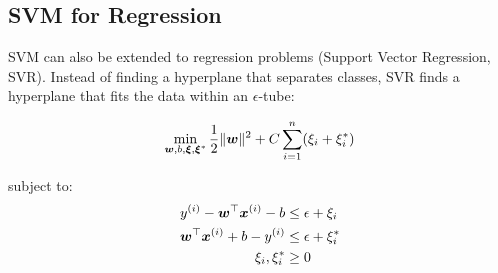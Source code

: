 \subsection{SVM for Regression}

SVM can also be extended to regression problems (Support Vector Regression, SVR). Instead of finding a hyperplane that separates classes, SVR finds a hyperplane that fits the data within an $\epsilon$-tube:

\begin{equation}
\min_{\boldsymbol{w}, b, \boldsymbol{\xi}, \boldsymbol{\xi}^*} \frac{1}{2}\|\boldsymbol{w}\|^2 + C \sum_{i=1}^{n} (\xi_i + \xi_i^*)
\end{equation}

subject to:
\begin{align}
y^{(i)} - \boldsymbol{w}^\top \boldsymbol{x}^{(i)} - b &\leq \epsilon + \xi_i \\
\boldsymbol{w}^\top \boldsymbol{x}^{(i)} + b - y^{(i)} &\leq \epsilon + \xi_i^* \\
\xi_i, \xi_i^* &\geq 0
\end{align}

